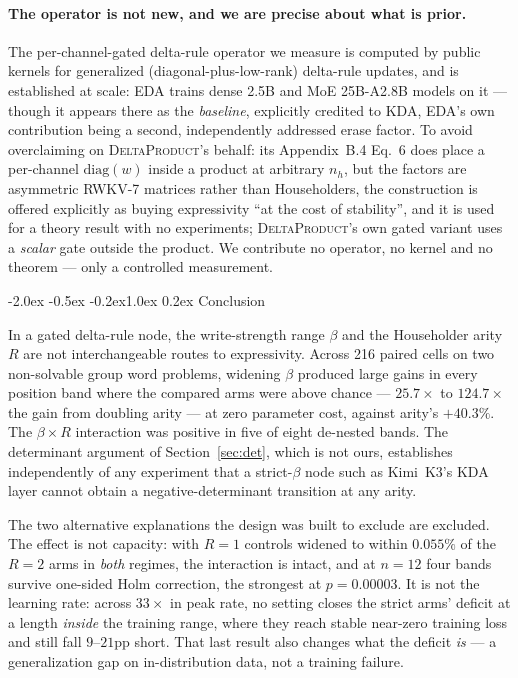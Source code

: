 \documentclass[10pt,twocolumn]{article}
\makeatletter
\renewcommand\section{\@startsection{section}{1}{\z@}%
  {-2.0ex \@plus -0.5ex \@minus -0.2ex}{1.0ex \@plus 0.2ex}%
  {\normalfont\large\bfseries}}
\makeatother
\begin{document}
\paragraph{The operator is not new, and we are precise about what is prior.}
The per-channel-gated delta-rule operator we measure is computed by public
kernels for generalized (diagonal-plus-low-rank) delta-rule updates, and is
established at scale: EDA \cite{li2026eda} trains dense 2.5B and MoE
25B-A2.8B models on it --- though it appears there as the \emph{baseline},
explicitly credited to KDA, EDA's own contribution being a second,
independently addressed erase factor. To avoid overclaiming on
\textsc{DeltaProduct}'s behalf: its Appendix~B.4 Eq.~6 does place a per-channel
$\mathrm{diag}(w)$ inside a product at arbitrary $n_h$, but the factors are
asymmetric RWKV-7 matrices rather than Householders, the construction is offered
explicitly as buying expressivity ``at the cost of stability'', and it is used
for a theory result with no experiments; \textsc{DeltaProduct}'s own gated
variant uses a \emph{scalar} gate outside the product. We contribute no
operator, no kernel and no theorem --- only a controlled measurement.

\section{Conclusion}
\label{sec:conclusion}

In a gated delta-rule node, the write-strength range $\beta$ and the Householder
arity $R$ are not interchangeable routes to expressivity. Across 216 paired cells
on two non-solvable group word problems, widening $\beta$ produced large gains
in every position band where the compared arms were above chance --- $25.7\times$
to $124.7\times$ the gain from doubling arity --- at zero parameter cost, against
arity's $+40.3\%$. The $\beta \times R$ interaction was positive in five of eight
de-nested bands. The determinant argument of Section~\ref{sec:det}, which is not
ours, establishes independently of any experiment that a strict-$\beta$ node such
as Kimi~K3's KDA layer cannot obtain a negative-determinant transition at any
arity.

The two alternative explanations the design was built to exclude are excluded.
The effect is not capacity: with $R{=}1$ controls widened to within $0.055\%$ of
the $R{=}2$ arms in \emph{both} regimes, the interaction is intact, and at
$n=12$ four bands survive one-sided Holm correction, the strongest at
$p=0.00003$. It is not the learning rate: across $33\times$ in peak rate, no
setting closes the strict arms' deficit at a length \emph{inside} the training
range, where they reach stable near-zero training loss and still fall $9$--$21$pp
short. That last result also changes what the deficit \emph{is} --- a
generalization gap on in-distribution data, not a training failure.
\end{document}
